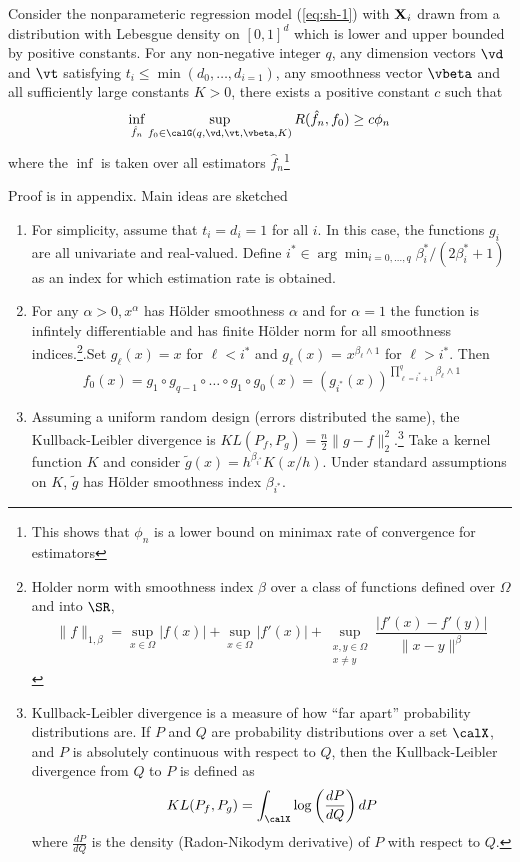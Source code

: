 \begin{theorem}
	\label{thm:sh-3}
	Consider the nonparameteric regression model (\ref{eq:sh-1}) with $\mathbf{X}_i$ drawn from a distribution with Lebesgue density on $[0,1]^d$ which is lower and upper bounded by positive constants. For any non-negative integer $q$, any dimension vectors $\vd$ and $\vt$ satisfying $t_i\leq \min(d_0, \dots, d_{i=1})$, any smoothness vector $\vbeta$ and all sufficiently large constants $K>0$, there exists a positive constant $c$ such that 
	\[\inf_{\hat{f}_n} \sup_{f_0\in \calG(q,\vd,\vt,\vbeta,K)} R(\hat{f}_n, f_0) \geq c \phi_n\]
	where the $\inf$ is taken over all estimators $\hat{f}_n$\footnote{This shows that $\phi_n$ is a lower bound on minimax rate of convergence for estimators}
\end{theorem}
Proof is in appendix. Main ideas are sketched
\begin{enumerate}
	\item For simplicity, assume that $t_i = d_i = 1$ for all $i$. In this case, the functions $g_i$ are all univariate and real-valued. Define $i^* \in \arg\min_{i=0,\dots,q} \beta^*_i/(2\beta^*_i + 1)$ as an index for which estimation rate is obtained. 
	\item For any $\alpha > 0, x^\alpha$ has Hölder smoothness $\alpha$ and for $\alpha = 1$ the function is infintely differentiable and has finite Hölder norm for all smoothness indices.\footnote{Holder norm with smoothness index $\beta$ over a class of functions defined over $\Omega$ and into $\SR$, $$ \|f\|_{1,\beta} = \sup_{x\in\Omega} |f(x)| + \sup_{x\in\Omega} |f'(x)| + \sup_{\substack{x,y\in\Omega \\ x\neq y}} \frac{|f'(x) - f'(y)|}{\|x-y\|^\beta}$$}.Set $g_\ell (x) = x$ for $\ell < i^*$ and $g_\ell(x)$ = $x^{\beta_\ell \wedge 1}$ for $\ell > i^*$. Then 
	\[f_0(x) = g_1 \circ g_{q-1} \circ \dots \circ g_1 \circ g_0(x) = \left(g_{i^*}(x)\right)^{\prod_{\ell = i^* + 1}^q \beta_\ell \wedge 1}\]
	\item Assuming a uniform random design (errors distributed the same), the Kullback-Leibler divergence is $KL(P_f, P_g) = \frac{n}{2}\|g-f\|^2_2.$\footnote{Kullback-Leibler divergence is a measure of how ``far apart'' probability distributions are. If $P$ and $Q$ are probability distributions over a set $\calX$, and $P$ is absolutely continuous with respect to $Q$, then the Kullback-Leibler divergence from $Q$ to $P$ is defined as 
	\[KL(P_f, P_g) = \int_\calX \log\left(\frac{dP}{dQ}\right)dP\] where $\frac{dP}{dQ}$ is the density (Radon-Nikodym derivative) of $P$ with respect to $Q$.} Take a kernel function $K$ and consider $\tilde{g}(x) = h^{\beta_{i^*}} K (x/h)$. Under standard assumptions on $K$, $\tilde{g}$ has Hölder smoothness index $\beta_{i^*}$.

\end{enumerate}
